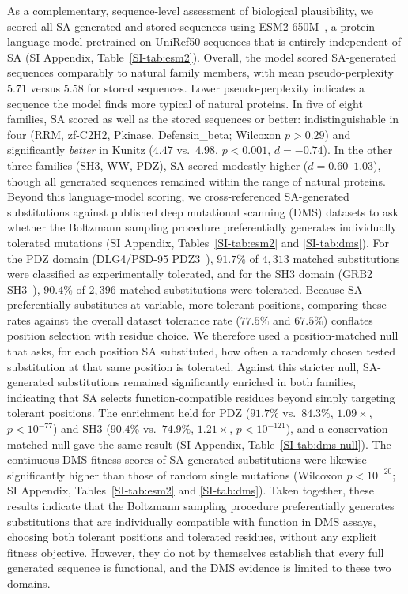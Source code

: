 \documentclass[11pt,onecolumn,twoside,lineno]{pnas-new}
\begin{document}
As a complementary, sequence-level assessment of biological plausibility, we scored all SA-generated and stored sequences using ESM2-650M~\cite{linEvolutionaryScaleModeling2023}, a protein language model pretrained on UniRef50 sequences that is entirely independent of SA (SI Appendix, Table~\ref{SI-tab:esm2}). Overall, the model scored SA-generated sequences comparably to natural family members, with mean pseudo-perplexity $5.71$ versus $5.58$ for stored sequences. Lower pseudo-perplexity indicates a sequence the model finds more typical of natural proteins. In five of eight families, SA scored as well as the stored sequences or better: indistinguishable in four (RRM, zf-C2H2, Pkinase, Defensin\_beta; Wilcoxon $p > 0.29$) and significantly \emph{better} in Kunitz ($4.47$ vs.\ $4.98$, $p < 0.001$, $d{=}{-}0.74$). In the other three families (SH3, WW, PDZ), SA scored modestly higher ($d{=}0.60$--$1.03$), though all generated sequences remained within the range of natural proteins. Beyond this language-model scoring, we cross-referenced SA-generated substitutions against published deep mutational scanning (DMS) datasets to ask whether the Boltzmann sampling procedure preferentially generates individually tolerated mutations (SI Appendix, Tables~\ref{SI-tab:esm2} and \ref{SI-tab:dms}). For the PDZ domain (DLG4/PSD-95 PDZ3~\cite{mclaughlinSpatialArchitecture2012}), $91.7\%$ of $4{,}313$ matched substitutions were classified as experimentally tolerated, and for the SH3 domain (GRB2 SH3~\cite{faureDoubleDMS2022}), $90.4\%$ of $2{,}396$ matched substitutions were tolerated. Because SA preferentially substitutes at variable, more tolerant positions, comparing these rates against the overall dataset tolerance rate ($77.5\%$ and $67.5\%$) conflates position selection with residue choice. We therefore used a position-matched null that asks, for each position SA substituted, how often a randomly chosen tested substitution at that same position is tolerated. Against this stricter null, SA-generated substitutions remained significantly enriched in both families, indicating that SA selects function-compatible residues beyond simply targeting tolerant positions. The enrichment held for PDZ ($91.7\%$ vs.\ $84.3\%$, $1.09\times$, $p < 10^{-77}$) and SH3 ($90.4\%$ vs.\ $74.9\%$, $1.21\times$, $p < 10^{-121}$), and a conservation-matched null gave the same result (SI Appendix, Table~\ref{SI-tab:dms-null}). The continuous DMS fitness scores of SA-generated substitutions were likewise significantly higher than those of random single mutations (Wilcoxon $p < 10^{-20}$; SI Appendix, Tables~\ref{SI-tab:esm2} and \ref{SI-tab:dms}). Taken together, these results indicate that the Boltzmann sampling procedure preferentially generates substitutions that are individually compatible with function in DMS assays, choosing both tolerant positions and tolerated residues, without any explicit fitness objective. However, they do not by themselves establish that every full generated sequence is functional, and the DMS evidence is limited to these two domains.
\end{document}
